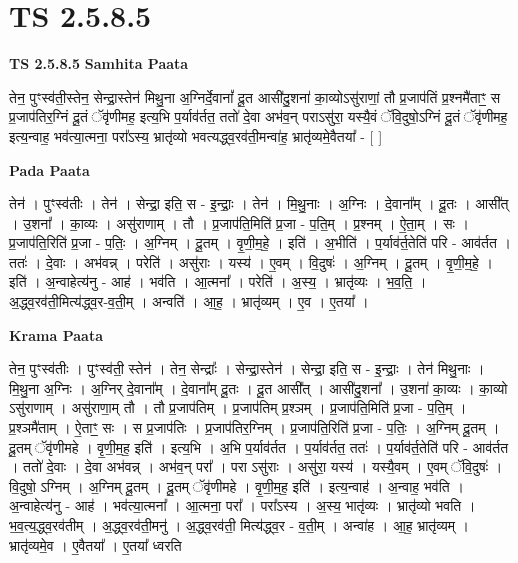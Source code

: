 \documentclass[17pt]{extarticle}
\begin{document}
\section{ TS 2.5.8.5 }

\textbf{TS 2.5.8.5 } \newline
\textbf{Samhita Paata} \newline

तेन॒ पुꣳस्व॑ती॒स्तेन॒ सेन्द्रा॒स्तेन॑ मिथु॒ना अ॒ग्निर्दे॒वानां᳚ दू॒त आसी॑दु॒शना॑ का॒व्योऽसु॑राणां॒ तौ प्र॒जाप॑तिं प्र॒श्नमै॑ताꣳ॒॒ स प्र॒जाप॑तिर॒ग्निं दू॒तं ॅवृ॑णीमह॒ इत्य॒भि प॒र्याव॑र्तत॒ ततो॑ दे॒वा अभ॑व॒न् पराऽसु॑रा॒ यस्यै॒वं ॅवि॒दुषो॒ऽग्निं दू॒तं ॅवृ॑णीमह॒ इत्य॒न्वाह॒ भव॑त्या॒त्मना॒ परा᳚ऽस्य॒ भ्रातृ॑व्यो भवत्यद्ध्व॒रव॑ती॒मन्वा॑ह॒ भ्रातृ॑व्यमे॒वैतया᳚ - [  ] \newline

\textbf{Pada Paata} \newline

तेन॑ । पुꣳस्व॑तीः । तेन॑ । सेन्द्रा॒ इति॒ स - इ॒न्द्राः॒ । तेन॑ । मि॒थु॒नाः । अ॒ग्निः । दे॒वाना᳚म् । दू॒तः । आसी᳚त् । उ॒शना᳚ । का॒व्यः । असु॑राणाम् । तौ । प्र॒जाप॑ति॒मिति॑ प्र॒जा - प॒ति॒म् । प्र॒श्नम् । ऐ॒ता॒म् । सः । प्र॒जाप॑ति॒रिति॑ प्र॒जा - प॒तिः॒ । अ॒ग्निम् । दू॒तम् । वृ॒णी॒म॒हे॒ । इति॑ । अ॒भीति॑ । प॒र्याव॑र्त॒तेति॑ परि - आव॑र्तत । ततः॑ । दे॒वाः । अभ॑वन्न् । परेति॑ । असु॑राः । यस्य॑ । ए॒वम् । वि॒दुषः॑ । अ॒ग्निम् । दू॒तम् । वृ॒णी॒म॒हे॒ । इति॑ । अ॒न्वाहेत्य॑नु - आह॑ । भव॑ति । आ॒त्मना᳚ । परेति॑ । अ॒स्य॒ । भ्रातृ॑व्यः । भ॒व॒ति॒ । अ॒द्ध्व॒रव॑ती॒मित्य॑द्ध्व॒र-व॒ती॒म् । अन्वति॑ । आ॒ह॒ । भ्रातृ॑व्यम् । ए॒व । ए॒तया᳚ ।  \newline


\textbf{Krama Paata} \newline

तेन॒ पुꣳस्व॑तीः । पुꣳस्व॑ती॒ स्तेन॑ । तेन॒ सेन्द्राः᳚ । सेन्द्रा॒स्तेन॑ । सेन्द्रा॒ इति॒ स - इ॒न्द्राः॒ । तेन॑ मिथु॒नाः । मि॒थु॒ना अ॒ग्निः । अ॒ग्निर् दे॒वाना᳚म् । दे॒वाना᳚म् दू॒तः । दू॒त आसी᳚त् । आसी॑दु॒शना᳚ । उ॒शना॑ का॒व्यः । का॒व्यो ऽसु॑राणाम् । असु॑राणा॒म् तौ । तौ प्र॒जाप॑तिम् । प्र॒जाप॑तिम् प्र॒श्ञम् । प्र॒जाप॑ति॒मिति॑ प्र॒जा - प॒ति॒म् । प्र॒श्ञमै॑ताम् । ऐ॒ताꣳ॒॒ सः । स प्र॒जाप॑तिः । प्र॒जाप॑तिर॒ग्निम् । प्र॒जाप॑ति॒रिति॑ प्र॒जा - प॒तिः॒ । अ॒ग्निम् दू॒तम् । दू॒तम् ॅवृ॑णीमहे । वृ॒णी॒म॒ह॒ इति॑ । इत्य॒भि । अ॒भि प॒र्याव॑र्तत । प॒र्याव॑र्तत॒ ततः॑ । प॒र्याव॑र्त॒तेति॑ परि - आव॑र्तत । ततो॑ दे॒वाः । दे॒वा अभ॑वन्न् । अभ॑व॒न् परा᳚ । परा ऽसु॑राः । असु॑रा॒ यस्य॑ । यस्यै॒वम् । ए॒वम् ॅवि॒दुषः॑ । वि॒दुषो॒ ऽग्निम् । अ॒ग्निम् दू॒तम् । दू॒तम् ॅवृ॑णीमहे । वृ॒णी॒म॒ह॒ इति॑ । इत्य॒न्वाह॑ । अ॒न्वाह॒ भव॑ति । अ॒न्वाहेत्य॑नु - आह॑ । भव॑त्या॒त्मना᳚ । आ॒त्मना॒ परा᳚ । परा᳚ऽस्य । अ॒स्य॒ भातृ॑व्यः । भ्रातृ॑व्यो भवति । भ॒व॒त्य॒द्ध्व॒रव॑तीम् । अ॒द्ध्व॒रव॑ती॒मनु॑ । अ॒द्ध्व॒रव॑ती॒ मित्य॑द्ध्व॒र - व॒ती॒म् । अन्वा॑ह । आ॒ह॒ भ्रातृ॑व्यम् । भ्रातृ॑व्यमे॒व । ए॒वैतया᳚ । ए॒तया᳚ ध्वरति \newline
\end{document}
